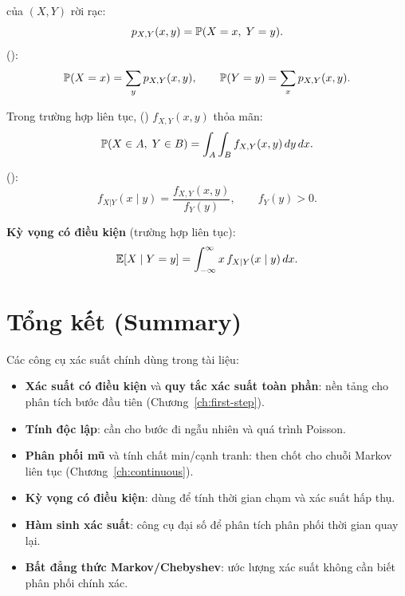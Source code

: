 \begin{dinhnghia}
 của $(X, Y)$ rời rạc:
\[
  p_{X,Y}(x, y) = \mathbb{P}(X = x,\; Y = y).
\]
 ():
\[
  \mathbb{P}(X = x) = \sum_y p_{X,Y}(x, y), \qquad
  \mathbb{P}(Y = y) = \sum_x p_{X,Y}(x, y).
\]
\end{dinhnghia}

Trong trường hợp liên tục,  () $f_{X,Y}(x,y)$ thỏa mãn:
\[
  \mathbb{P}(X \in A,\; Y \in B) = \int_A \int_B f_{X,Y}(x,y)\,dy\,dx.
\]

 ():
\[
  f_{X|Y}(x \mid y) = \frac{f_{X,Y}(x,y)}{f_Y(y)}, \qquad f_Y(y) > 0.
\]

\textbf{Kỳ vọng có điều kiện} (trường hợp liên tục):
\[
  \mathbb{E}[X \mid Y = y] = \int_{-\infty}^{\infty} x\, f_{X|Y}(x \mid y)\,dx.
\]

\section{Tổng kết (Summary)}

\begin{tomtat}
Các công cụ xác suất chính dùng trong tài liệu:
\begin{itemize}[nosep]
  \item \textbf{Xác suất có điều kiện} và \textbf{quy tắc xác suất toàn phần}: nền tảng cho phân tích bước đầu tiên (Chương~\ref{ch:first-step}).
  \item \textbf{Tính độc lập}: cần cho bước đi ngẫu nhiên và quá trình Poisson.
  \item \textbf{Phân phối mũ} và tính chất min/cạnh tranh: then chốt cho chuỗi Markov liên tục (Chương~\ref{ch:continuous}).
  \item \textbf{Kỳ vọng có điều kiện}: dùng để tính thời gian chạm và xác suất hấp thụ.
  \item \textbf{Hàm sinh xác suất}: công cụ đại số để phân tích phân phối thời gian quay lại.
  \item \textbf{Bất đẳng thức Markov/Chebyshev}: ước lượng xác suất không cần biết phân phối chính xác.
\end{itemize}
\end{tomtat}
